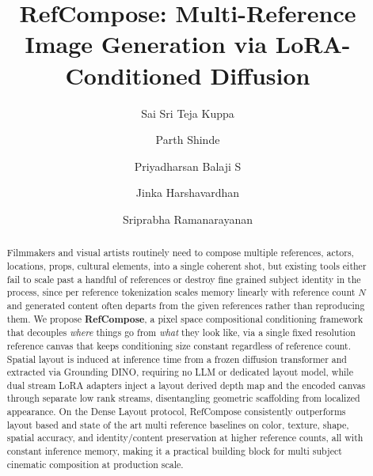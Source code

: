 \documentclass[runningheads]{llncs}
\begin{document}
\title{RefCompose: Multi-Reference Image Generation via LoRA-Conditioned Diffusion} 


\author{Sai Sri Teja Kuppa \and
Parth Shinde \and
Priyadharsan Balaji S \and
Jinka Harshavardhan \and
Sriprabha Ramanarayanan}



\maketitle

\begin{abstract}
  Filmmakers and visual artists routinely need to compose multiple references, actors, locations, props, cultural elements, into a single coherent shot, but existing tools either fail to scale past a handful of references or destroy fine grained subject identity in the process, since per reference tokenization scales memory linearly with reference count $N$ and generated content often departs from the given references rather than reproducing them. We propose \textbf{RefCompose}, a pixel space compositional conditioning framework that decouples \emph{where} things go from \emph{what} they look like, via a single fixed resolution reference canvas that keeps conditioning size constant regardless of reference count. Spatial layout is induced at inference time from a frozen diffusion transformer and extracted via Grounding DINO, requiring no LLM or dedicated layout model, while dual stream LoRA adapters inject a layout derived depth map and the encoded canvas through separate low rank streams, disentangling geometric scaffolding from localized appearance. On the Dense Layout protocol, RefCompose consistently outperforms layout based and state of the art multi reference baselines on color, texture, shape, spatial accuracy, and identity/content preservation at higher reference counts, all with constant inference memory, making it a practical building block for multi subject cinematic composition at production scale.
  \end{abstract}
\end{document}
